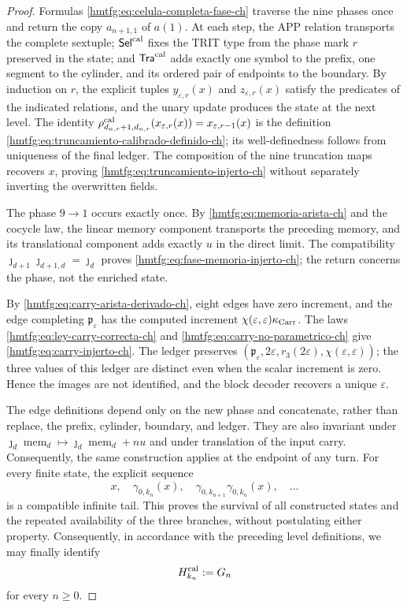 \begin{proof}
Formulas \eqref{hmtfg:eq:celula-completa-fase-ch} traverse the nine phases once and
return the copy \(a_{n+1,1}\) of \(a(1)\). At each step, the APP relation
transports the complete sextuple; \(\mathsf{Sel}^{\rm cal}\) fixes the TRIT
type from the phase mark \(r\) preserved in the state; and
\(\mathsf{Tra}^{\rm cal}\) adds exactly one symbol to the prefix, one segment
to the cylinder, and its ordered pair of endpoints to the boundary. By
induction on \(r\), the explicit tuples \(y_{\varepsilon,r}(x)\) and
\(z_{\varepsilon,r}(x)\) satisfy the predicates of the indicated relations,
and the unary update produces the state at the next level. The identity
\(\rho^{\rm cal}_{d_{n,r}+1,d_{n,r}}
(x_{\varepsilon,r}(x))=x_{\varepsilon,r-1}(x)\) is the definition
\eqref{hmtfg:eq:truncamiento-calibrado-definido-ch}; its well-definedness follows
from uniqueness of the final ledger. The composition of the nine truncation
maps recovers \(x\), proving \eqref{hmtfg:eq:truncamiento-injerto-ch} without
separately inverting the overwritten fields.

The phase \(9\to1\) occurs exactly once. By
\eqref{hmtfg:eq:memoria-arista-ch} and the cocycle law, the linear memory component
transports the preceding memory, and its translational component adds exactly
\(u\) in the direct limit. The compatibility
\(\jmath_{d+1}\jmath_{d+1,d}=\jmath_d\) proves
\eqref{hmtfg:eq:fase-memoria-injerto-ch}; the return concerns the phase, not the
enriched state.

By \eqref{hmtfg:eq:carry-arista-derivado-ch}, eight edges have zero increment, and
the edge completing \(\mathfrak p_\varepsilon\) has the computed increment
\(\chi(\varepsilon,\varepsilon)\kappa_{\rm Carr}\). The laws
\eqref{hmtfg:eq:ley-carry-correcta-ch} and
\eqref{hmtfg:eq:carry-no-parametrico-ch}
give \eqref{hmtfg:eq:carry-injerto-ch}. The ledger preserves
\((\mathfrak p_\varepsilon,2\varepsilon,r_3(2\varepsilon),
\chi(\varepsilon,\varepsilon))\); the three values of this ledger are
distinct even when the scalar increment is zero. Hence the images are not
identified, and the block decoder recovers a unique \(\varepsilon\).

The edge definitions depend only on the new phase and concatenate, rather than
replace, the prefix, cylinder, boundary, and ledger. They are also invariant
under
\(\jmath_d\operatorname{mem}_d\mapsto
  \jmath_d\operatorname{mem}_d+nu\)
and under translation of the input carry. Consequently, the same construction
applies at the endpoint of any turn. For every finite state, the explicit
sequence
\[
 x,\quad\gamma_{0,k_n}(x),\quad
 \gamma_{0,k_{n+1}}\gamma_{0,k_n}(x),\quad\ldots
\]
is a compatible infinite tail. This proves the survival of all constructed
states and the repeated availability of the three branches, without
postulating either property. Consequently, in accordance with the preceding
level definitions, we may finally identify
\begin{equation}
 H_{k_n}^{\rm cal}:=G_n
 \label{hmtfg:eq:subarbol-calibrado-superviviente-ch}
\end{equation}
for every \(n\ge0\).
\end{proof}

